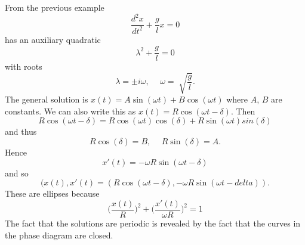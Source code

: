 \begin{example} 
From the previous example $$\frac{d^2x}{dt^2}+\frac{g}{l}x = 0$$ has an auxiliary quadratic $$\lambda^2 + \frac{g}{l} = 0$$ with roots $$\lambda = \pm i \omega, \hspace{15pt} \omega = \sqrt[]{\frac{g}{l}}.$$ The general solution is $x(t) = A\sin(\omega t) + B\cos(\omega t)$ where $A$, $B$ are constants. We can also write this as $x(t) = R\cos(\omega t - \delta).$ Then $$R\cos(\omega t - \delta) = R\cos(\omega t )\cos(\delta)+R\sin(\omega t)sin(\delta)$$ and thus $$R\cos(\delta) = B, \hspace{15pt} R\sin(\delta) = A.$$ Hence $$x'(t) = -\omega R \sin(\omega t -\delta)$$ and so $$(x(t),x'(t) = (R\cos(\omega t - \delta), -\omega R\sin(\omega t -delta)).$$ These are ellipses because $$\bigg(\frac{x(t)}{R}\bigg)^2+\bigg(\frac{x'(t)}{\omega R}\bigg)^2 = 1$$ The fact that the solutions are periodic is revealed by the fact that the curves in the phase diagram are closed.
\end{example}
